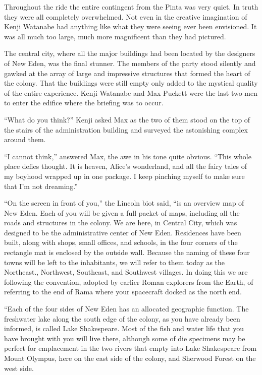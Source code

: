 \documentclass[]{article}
\begin{document}
{Throughout the ride the entire contingent from the Pinta was very quiet.  In truth they were all completely overwhelmed.  Not even in the creative imagination of Kenji Watanabe had anything like what they were seeing ever been envisioned.  It was all much too large, much more magnificent than they had pictured.

The central city, where all the major buildings had been located by the designers of New Eden, was the final stunner.  The members of the party stood silently and gawked at the array of large and impressive structures that formed the heart of the colony.  That the buildings were still empty only added to the mystical quality of the entire experience.  Kenji Watanabe and Max Puckett were the last two men to enter the edifice where the briefing was to occur.

“What do you think?” Kenji asked Max as the two of them stood on the top of the stairs of the administration building and surveyed the astonishing complex around them.

“I cannot think,” answered Max, the awe in his tone quite obvious.  “This whole place defies thought.  It is heaven, Alice’s wonderland, and all the fairy tales of my boyhood wrapped up in one package.  I keep pinching myself to make sure that I’m not dreaming.”

“On the screen in front of you,” the Lincoln biot said, “is an overview map of New Eden.  Each of you will be given a full packet of maps, including all the roads and structures in the colony.  We are here, in Central City, which was designed to be the administrative center of New Eden.  Residences have been built, along with shops, small offices, and schools, in the four corners of the rectangle mat is enclosed by the outside wall.  Because the naming of these four towns will be left to the inhabitants, we will refer to them today as the Northeast., Northwest, Southeast, and Southwest villages.  In doing this we are following the convention, adopted by earlier Roman explorers from the Earth, of referring to the end of Rama where your spacecraft docked as the north end.

“Each of the four sides of New Eden has an allocated geographic function.  The freshwater lake along the south edge of the colony, as you have already been informed, is called Lake Shakespeare.  Most of the fish and water life that you have brought with you will live there, although some of die specimens may be perfect for emplacement in the two rivers that empty into Lake Shakespeare from Mount Olympus, here on the east side of the colony, and Sherwood Forest on the west side.

}
\end{document}
